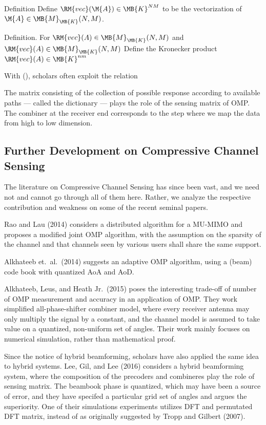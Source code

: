 \Result
{Definition}
{
Define \(\RM{vec} (\M{A}) \in \MB{K}^{NM}\) to be the vectorization of \(\M{A} \in \MB{M}_{\MB{K}} (N,M)\).
}

\Result
{Definition.}
{
For \(\RM{vec} (A) \in \MB{M}_{\MB{K}} (N,M)\) and \(\RM{vec} (A) \in \MB{M}_{\MB{K}} (N,M)\)
Define the Kronecker product \(\RM{vec} (A) \in \MB{K}^{nm}\) 
}

With (), scholars often exploit the relation
%
%

The matrix consisting of the collection of possible response according to available paths --- called the dictionary --- plays the role of the sensing matrix of OMP.
The combiner at the receiver end corresponds to the step where we map the data from high to low dimension.

\subsection{Further Development on Compressive Channel Sensing}

The literature on Compressive Channel Sensing has since been vast, and we need not and cannot go through all of them here.
Rather, we analyze the respective contribution and weakness on some of the recent seminal papers.

Rao and Lau (2014) considers a distributed algorithm for a MU-MIMO and proposes a modified joint OMP algorithm, with the assumption on the sparsity of the channel and that channels seen by various users shall share the same support.

Alkhateeb et.\ al.\ (2014) suggests an adaptive OMP algorithm, using a (beam) code book with quantized AoA and AoD.

Alkhateeb, Leus, and Heath Jr.\ (2015) poses the interesting trade-off of number of OMP measurement and accuracy in an application of OMP.
They work simplified all-phase-shifter combiner model, where every receiver antenna may only multiply the signal by a constant, and the channel model is assumed to take value on a quantized, non-uniform set of angles.
Their work mainly focuses on numerical simulation, rather than mathematical proof.

Since the notice of hybrid beamforming, scholars have also applied the same idea to hybrid systems.
Lee, Gil, and Lee (2016) considers a hybrid beamforming system, where the composition of the precoders and combineres play the role of sensing matrix.
The beambook phase is quantized, which may have been a source of error, and they have specifed a particular grid set of angles and argues the superiority.
One of their simulations experiments utilizes DFT and permutated DFT matrix, instead of as originally suggested by Tropp and Gilbert (2007).

